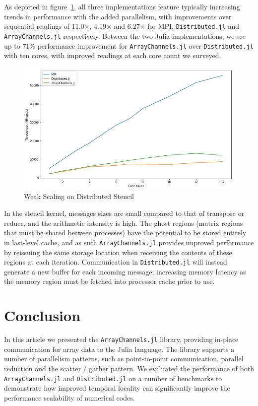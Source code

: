 \documentclass{juliacon}
\begin{document}
As depicted in figure~\ref{fig:plot-stencil}, all three implementations feature typically increasing trends in
performance with the added parallelism, with improvements over
sequential readings of 11.0\(\times\), 4.19\(\times\) and 6.27\(\times\)
for MPI, \texttt{Distributed.jl} and \texttt{ArrayChannels.jl}
respectively. Between the two Julia implementations, we see up to 71\%
performance improvement for \texttt{ArrayChannels.jl} over
\texttt{Distributed.jl} with ten cores, with improved readings at each
core count we surveyed.

\begin{figure}[htb]
	\includegraphics[width=\linewidth]{figs/stencil.png}
	\caption{Weak Scaling on Distributed Stencil}
	\label{fig:plot-stencil}
\end{figure}

In the stencil kernel, messages sizes are small compared to that of
transpose or reduce, and the arithmetic intensity is high. The ghost
regions (matrix regions that must be shared between processes) have the
potential to be stored entirely in last-level cache, and as such
\texttt{ArrayChannels.jl} provides improved performance by reissuing the
same storage location when receiving the contents of these regions at
each iteration. Communication in \texttt{Distributed.jl} will instead
generate a new buffer for each incoming message, increasing memory
latency as the memory region must be fetched into processor cache prior
to use.


\section{Conclusion}
In this article we presented the \texttt{ArrayChannels.jl} library, providing in-place communication for array data to the Julia language. The library supports a number of parallelism patterns, such as point-to-point communication, parallel reduction and the scatter / gather pattern. We evaluated the performance of both \texttt{ArrayChannels.jl} and \texttt{Distributed.jl} on a number of benchmarks to demonstrate how improved temporal locality can significantly improve the performance scalability of numerical codes.
\end{document}
